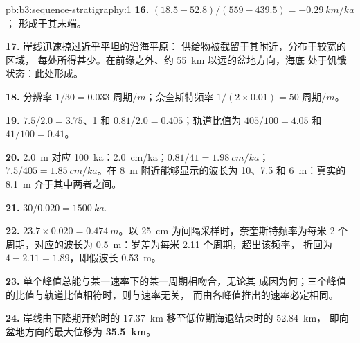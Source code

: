 \begin{solution}{pb:b3:sequence-stratigraphy:1}
\textbf{16.} $(18.5 - 52.8)/(559 - 439.5) = \qty{-0.29}{km/ka}$；
形成于其末端。

\textbf{17.} 岸线迅速掠过近乎平坦的沿海平原：
供给物被截留于其附近，分布于较宽的区域，
每处所得甚少。在前缘之外、约 \qty{55}{km} 以远的盆地方向，海底
处于饥饿状态：此处形成。

\textbf{18.} 分辨率 $1/30 = \num{0.033}\text{ 周期}/\unit{m}$；奈奎斯特频率 $1/(2\times
0.01) = \num{50}\text{ 周期}/\unit{m}$。

\textbf{19.} $7.5/2.0 = 3.75$、1 和 $0.81/2.0 = 0.405$；轨道比值为
$405/100 = 4.05$ 和 $41/100 = 0.41$。

\textbf{20.} \qty{2.0}{m} 对应 \qty{100}{ka}：\qty{2.0}{cm/ka}；$0.81/41 =
\qty{1.98}{cm/ka}$；$7.5/405 = \qty{1.85}{cm/ka}$。在
\qty{8}{m} 附近能够显示的波长为 10、7.5 和 \qty{6}{m}：真实的
\qty{8.1}{m} 介于其中两者之间。

\textbf{21.} $30/0.020 = \qty{1500}{ka}$.

\textbf{22.} $23.7\times0.020 = \qty{0.474}{m}$。以
\qty{25}{cm} 为间隔采样时，奈奎斯特频率为每米 2 个周期，对应的波长为
\qty{0.5}{m}：岁差为每米 2.11 个周期，超出该频率，
折回为 $4 - 2.11 = 1.89$，即假波长 \qty{0.53}{m}。

\textbf{23.} 单个峰值总能与某一速率下的某一周期相吻合，无论其
成因为何；三个峰值的比值与轨道比值相符时，则与速率无关，
而由各峰值推出的速率必定相同。

\textbf{24.} 岸线由下降期开始时的 \qty{17.37}{km}
移至低位期海退结束时的 \qty{52.84}{km}，
即向盆地方向的最大位移为 \textbf{\qty[text-series-to-math=true]{35.5}{km}}。
\end{solution}
